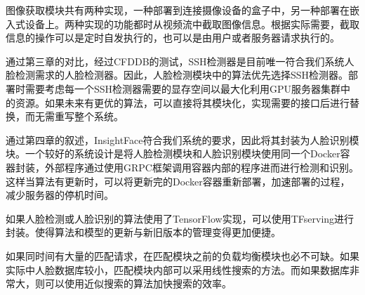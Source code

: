 图像获取模块共有两种实现，一种部署到连接摄像设备的盒子中，另一种部署在嵌入式设备上。两种实现的功能都时从视频流中截取图像信息。根据实际需要，截取信息的操作可以是定时自发执行的，也可以是由用户或者服务器请求执行的。

通过第三章的对比，经过CFDDB的测试，SSH检测器\cite{najibi2017ssh}是目前唯一符合我们系统人脸检测需求的人脸检测器。因此，人脸检测模块中的算法优先选择SSH检测器。部署时需要考虑每一个SSH检测器需要的显存空间以最大化利用GPU服务器集群中的资源。如果未来有更优的算法，可以直接将其模块化，实现需要的接口后进行替换，而无需重写整个系统。

通过第四章的叙述，InsightFace\cite{deng2018arcface}符合我们系统的要求，因此将其封装为人脸识别模块。一个较好的系统设计是将人脸检测模块和人脸识别模块使用同一个Docker容器封装，外部程序通过使用GRPC框架调用容器内部的程序进而进行检测和识别。这样当算法有更新时，可以将更新完的Docker容器重新部署，加速部署的过程，减少服务器的停机时间。

如果人脸检测或人脸识别的算法使用了TensorFlow实现，可以使用TFserving进行封装。使得算法和模型的更新与新旧版本的管理变得更加便捷。

如果同时间有大量的匹配请求，在匹配模块之前的负载均衡模块也必不可缺。如果实际中人脸数据库较小，匹配模块内部可以采用线性搜索的方法。而如果数据库非常大，则可以使用近似搜索的算法加快搜索的效率。



